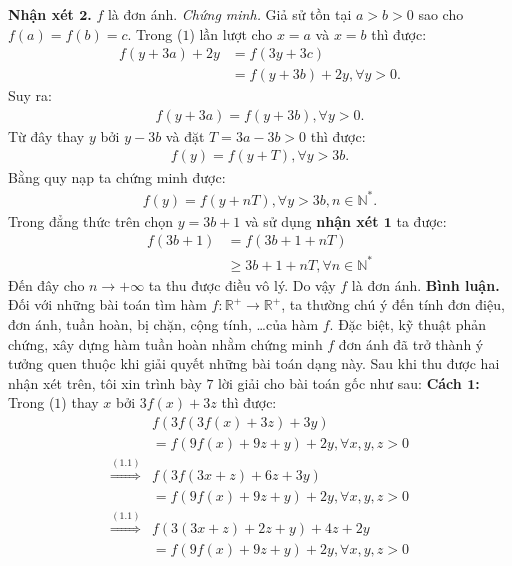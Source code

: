 \begin{multicols}{2}
	\vskip 0.1cm
	\textbf{\color{hoccungpi}Nhận xét $\pmb2$.} $f$ là đơn ánh.
	\vskip 0.1cm
	\textit{Chứng minh.}  Giả sử tồn tại $a > b > 0$  sao cho $f(a) = f(b) = c$.  Trong ($1$) lần lượt cho $x = a $ và $x = b$  thì được: 
	\begin{align*}
		f(y + 3a) + 2y &= f(3y + 3c) \\
		&= f(y + 3b) + 2y,\forall y > 0.
	\end{align*}
	Suy ra: 
	\begin{align*}
		f(y + 3a) = f(y + 3b),\forall y > 0.
	\end{align*}
	Từ đây thay $y$  bởi $y - 3b$  và đặt $T = 3a - 3b > 0$  thì được:
	\begin{align*}
		f(y) = f(y + T),\forall y > 3b.
	\end{align*}
	Bằng quy nạp ta chứng minh được: 
	\begin{align*}
		f(y) = f(y + nT),\forall y > 3b,n \in \mathbb{N^*}.
	\end{align*}
	Trong đẳng thức trên chọn $y = 3b + 1$  và sử dụng \textbf{\color{hoccungpi}nhận xét $\pmb1$} ta được: 
	\begin{align*}
		f(3b + 1) &= f(3b + 1 + nT) \\
		&\ge 3b + 1 + nT,\forall n \in \mathbb{N^*}
	\end{align*}
	Đến đây cho  $n \to +\infty$ ta thu được điều vô lý. Do vậy $f$  là đơn ánh.
	\vskip 0.1cm
	\textbf{\color{hoccungpi}Bình luận.} Đối với những bài toán tìm hàm  $f: \mathbb{R^+} \to \mathbb{R^+}$, ta thường chú ý đến tính đơn điệu, đơn ánh, tuần hoàn, bị chặn, cộng tính, \ldots của hàm  $f$. Đặc biệt, kỹ thuật phản chứng, xây dựng hàm tuần hoàn nhằm chứng minh $f$  đơn ánh đã trở thành ý tưởng quen thuộc khi giải quyết những bài toán dạng này.
	\vskip 0.1cm 
	Sau khi thu được hai nhận xét trên, tôi xin trình bày $7$ lời giải cho bài toán gốc như sau:
	\vskip 0.1cm
	\textbf{\color{hoccungpi}Cách $\pmb{1}$:}
	\vskip 0.1cm
	Trong ($1$) thay $x$  bởi $3f(x) + 3z$ thì được: 
	\begin{align*}
		&f(3f(3f(x) + 3z) + 3y) \\
		&=f(9f(x) + 9z + y) + 2y,\forall x,y,z > 0\\
		\mathop  \Rightarrow \limits^{(1.1)} &f(3f(3x + z) + 6z + 3y) \\
		&= f(9f(x) + 9z + y) + 2y,\forall x,y,z > 0\\
		\mathop  \Rightarrow \limits^{(1.1)} &f(3(3x + z) + 2z + y) + 4z + 2y \\
		&= f(9f(x) + 9z + y) + 2y,\forall x,y,z > 0\\

\end{align*}
\end{multicols}
